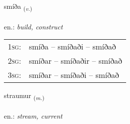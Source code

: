 \documentclass[frontgrid, backgrid]{flacards}\usepackage[]{graphicx}\usepackage[]{xcolor}
\begin{document}
\renewcommand{\flhead}{\vskip5pt \fboxsep=0pt {\small\bfseries\footnotesize Sagnorð | Verb}}
\renewcommand{\fcfoot}{\vskip5pt \fboxsep=0pt \hspace{2pt}{\small\bfseries\footnotesize 2K}}

\renewcommand{\blhead}{\vskip5pt {\small\bfseries\footnotesize Sagnorð | Verb }}
\renewcommand{\bcfoot}{\vskip5pt \hspace{2pt}{\small\bfseries\footnotesize 2K}}


{smíða \small{\textsubscript{(\textit{v.})}} \\[1ex] %
\textphonetic{[smiːða]} \\
en.: \emph{build, construct} \\  [2ex]
\renewcommand*{\arraystretch}{0.8}
\begin{tabular}{p{1cm}l}
\textsc{1sg}: & smíða -- smíðaði -- smíðað \\ 
\textsc{2sg}: & smíðar -- smíðaðir -- smíðað \\ 
\textsc{3sg}: & smíðar -- smíðaði -- smíðað \\ 
\end{tabular}
}

\renewcommand{\flhead}{\vskip5pt \fboxsep=0pt {\small\bfseries\footnotesize Nafnorð | Noun}}
\renewcommand{\fcfoot}{\vskip5pt \fboxsep=0pt \hspace{2pt}{\small\bfseries\footnotesize 2K}}

\renewcommand{\blhead}{\vskip5pt {\small\bfseries\footnotesize Nafnorð | Noun }}
\renewcommand{\bcfoot}{\vskip5pt \hspace{2pt}{\small\bfseries\footnotesize 2K}}


{straumur \small{\textsubscript{(\textit{m.})}} \\[1ex] %
\textphonetic{[strœiːmʏr]} \\
en.: \emph{stream, current} \\  [2ex]
\renewcommand*{\arraystretch}{0.8}
}
\end{document}
